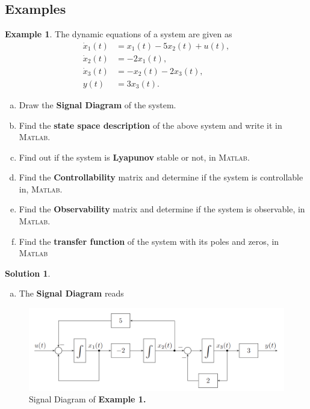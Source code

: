\documentclass[a4paper,12 pt]{article}
\numberwithin{equation}{section}
\theoremstyle{definition}
\newtheorem{bsp}{Example}
\theoremstyle{remark}
\theoremstyle{definition}
\newtheorem*{lsg}{Solution}
\theoremstyle{definition}
\theoremstyle{definition}
\theoremstyle{remark}
\begin{document}
\subsection{Examples}
\begin{bsp}
The dynamic equations of a system are given as
\begin{equation*}
\begin{align}
\dot{x}_1(t)&=x_1(t)-5x_2(t)+u(t),\\
\dot{x}_2(t)&=-2x_1(t),\\
\dot{x}_3(t)&=-x_2(t)-2x_3(t),\\
y(t)&=3x_3(t).
\end{align}
\end{equation*}

\begin{enumerate}[(a)]
\item Draw the \textbf{Signal Diagram} of the system.
\item Find the \textbf{state space description} of the above system and write it in \textsc{Matlab}.
\item Find out if the system is \textbf{Lyapunov} stable or not, in \textsc{Matlab}.
\item Find the \textbf{Controllability} matrix and determine if the system is controllable in, \textsc{Matlab}.
\item Find the \textbf{Observability} matrix and determine if the system is observable, in \textsc{Matlab}.
\item Find the \textbf{transfer function} of the system with its poles and zeros, in \textsc{Matlab} 

\end{enumerate}
\newpage
\begin{lsg}
\
\begin{enumerate}[(a)]
\item The \textbf{Signal Diagram} reads

\end{enumerate}

\begin{figure}[h!]
\begin{center}
\includegraphics[width=0.85\columnwidth]{signal.png}
\caption{Signal Diagram of \textbf{Example 1.} }
\label{fig:signal}
\end{center}
\end{figure}


\end{lsg}
\end{bsp}
\end{document}
